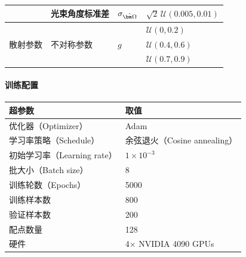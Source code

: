 \begin{table}[!htp]
\begin{tabular}{lp{}ll}
                              & 光束角度标准差                  & $\sigma_{\bOmega}$       & $\sqrt{2}\,\mathcal{U}(0.005, 0.01)$ \\
        \midrule
        \multirow{3}{*}{散射参数} & \multirow{3}{*}{不对称参数}   & \multirow{3}{*}{$g$}     & $\mathcal{U}(0,0.2)$                 \\
                              &                          &                          & $\mathcal{U}(0.4,0.6)$               \\
                              &                          &                          & $\mathcal{U}(0.7,0.9)$               \\
        \bottomrule
    \end{tabular}
    \label{tab:dataset}
\end{table}

\paragraph{训练配置}

\begin{table}[!htp]
    \centering
    \begin{tabular}{ll}
        \toprule
        超参数                  & 取值                         \\ \midrule
        优化器（Optimizer）       & Adam                       \\
        学习率策略（Schedule）      & 余弦退火（Cosine annealing）     \\
        初始学习率（Learning rate） & $1 \times 10^{-3}$         \\
        批大小（Batch size）      & 8                          \\
        训练轮数（Epochs）         & 5000                       \\
        训练样本数                & 800                        \\
        验证样本数                & 200                        \\
        配点数量                 & 128                        \\
        硬件                   & 4$\times$ NVIDIA 4090 GPUs \\
        \bottomrule
    \end{tabular}
    \label{tab:training_details}
\end{table}

